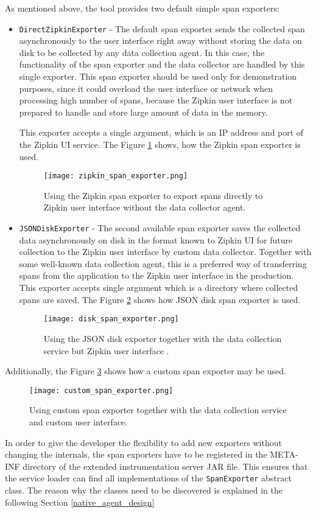 As mentioned above, the tool provides two default simple span exporters:
\begin{itemize}
	\item  \texttt{DirectZipkinExporter} - The default span exporter sends the collected span asynchronously to the user interface right away without storing the data on disk to be collected by any data collection agent. In this case, the functionality of the span exporter and the data collector are handled by this single exporter. 
	This span exporter should be used only for demonstration purposes, since it could overload the user interface or network when processing high number of spans, because the Zipkin user interface is not prepared to handle and store large amount of data in the memory. 
	
	This exporter accepts a single argument, which is an IP address and port of the Zipkin UI service. The Figure \ref{fig:zipkin_span_exporter} shows, how the Zipkin span exporter is used.
	
		\begin{figure}
			\centering
			\texttt{[image: zipkin\_span\_exporter.png]}
			\caption{Using the Zipkin span exporter to export spans directly to Zipkin user interface without the data collector agent.}
			\label{fig:zipkin_span_exporter}
		\end{figure}
	\item  \texttt{JSONDiskExporter} - The second available span exporter saves the collected data asynchronously on disk in the format known to Zipkin UI for future collection to the Zipkin user interface by custom data collector. Together with some well-known data collection agent, this is a preferred way of transferring spans from the application to the Zipkin user interface in the production. This exporter accepts single argument which is a directory where collected spans are saved. The Figure \ref{fig:disk_span_exporter} shows how JSON disk span exporter is used.
	\begin{figure}
		\centering
		\texttt{[image: disk\_span\_exporter.png]}
		\caption{Using the JSON disk exporter together with the data collection service but Zipkin user interface .}
		\label{fig:disk_span_exporter}
	\end{figure}
\end{itemize}
Additionally, the Figure \ref{fig:custom_span_exporter} shows how a custom span exporter may be used.

\begin{figure}
	\centering
	\texttt{[image: custom\_span\_exporter.png]}
	\caption{Using custom span exporter together with the data collection service and custom user interface.}
	\label{fig:custom_span_exporter}
\end{figure}
In order to give the developer the flexibility to add new exporters without changing the internals, the span exporters have to be  registered in the META-INF directory of the extended instrumentation server JAR file. This ensures that the service loader can find all implementations of the \texttt{SpanExporter} abstract class. The reason why the classes need to be discovered is explained in the following Section \ref{native_agent_design}

